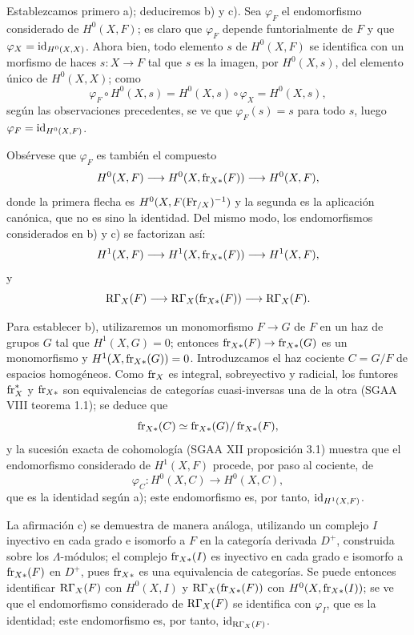 Establezcamos primero a); deduciremos b) y c). Sea $\varphi_F$ el endomorfismo considerado de $H^0(X,F)$; es claro que $\varphi_F$ depende funtorialmente de $F$ y que $\varphi_X=\operatorname{id}_{H^0(X,X)}$. Ahora bien, todo elemento $s$ de $H^0(X,F)$ se identifica con un morfismo de haces $s:X\to F$ tal que $s$ es la imagen, por $H^0(X,s)$, del elemento único de $H^0(X,X)$; como
\[
\varphi_F\circ H^0(X,s)=H^0(X,s)\circ\varphi_X=H^0(X,s),
\]
según las observaciones precedentes, se ve que $\varphi_F(s)=s$ para todo $s$, luego $\varphi_F=\operatorname{id}_{H^0(X,F)}$.

Obsérvese que $\varphi_F$ es también el compuesto
\[
H^0(X,F)\longrightarrow H^0(X,\operatorname{fr}_{X*}(F))
\longrightarrow H^0(X,F),
\]
donde la primera flecha es $H^0(X,F(\operatorname{Fr}_{/X})^{-1})$ y la segunda es la aplicación canónica, que no es sino la identidad. Del mismo modo, los endomorfismos considerados en b) y c) se factorizan así:
\[
H^1(X,F)\longrightarrow H^1(X,\operatorname{fr}_{X*}(F))
\longrightarrow H^1(X,F),
\]
y
\[
\mathrm{R}\Gamma_X(F)\longrightarrow \mathrm{R}\Gamma_X(\operatorname{fr}_{X*}(F))
\longrightarrow \mathrm{R}\Gamma_X(F).
\]

Para establecer b), utilizaremos un monomorfismo $F\to G$ de $F$ en un haz de grupos $G$ tal que $H^1(X,G)=0$; entonces $\operatorname{fr}_{X*}(F)\to\operatorname{fr}_{X*}(G)$ es un monomorfismo y $H^1(X,\operatorname{fr}_{X*}(G))=0$. Introduzcamos el haz cociente $C=G/F$ de espacios homogéneos. Como $\operatorname{fr}_X$ es integral, sobreyectivo y radicial, los funtores $\operatorname{fr}_X^*$ y $\operatorname{fr}_{X*}$ son equivalencias de categorías cuasi-inversas una de la otra (SGAA VIII teorema 1.1); se deduce que
\[
\operatorname{fr}_{X*}(C)\simeq\operatorname{fr}_{X*}(G)/\operatorname{fr}_{X*}(F),
\]
y la sucesión exacta de cohomología (SGAA XII proposición 3.1) muestra que el endomorfismo considerado de $H^1(X,F)$ procede, por paso al cociente, de
\[
\varphi_C:H^0(X,C)\longrightarrow H^0(X,C),
\]
que es la identidad según a); este endomorfismo es, por tanto, $\operatorname{id}_{H^1(X,F)}$.

La afirmación c) se demuestra de manera análoga, utilizando un complejo $I$ inyectivo en cada grado e isomorfo a $F$ en la categoría derivada $D^+$, construida sobre los $\Lambda$-módulos; el complejo $\operatorname{fr}_{X*}(I)$ es inyectivo en cada grado e isomorfo a $\operatorname{fr}_{X*}(F)$ en $D^+$, pues $\operatorname{fr}_{X*}$ es una equivalencia de categorías. Se puede entonces identificar $\mathrm{R}\Gamma_X(F)$ con $H^0(X,I)$ y $\mathrm{R}\Gamma_X(\operatorname{fr}_{X*}(F))$ con $H^0(X,\operatorname{fr}_{X*}(I))$; se ve que el endomorfismo considerado de $\mathrm{R}\Gamma_X(F)$ se identifica con $\varphi_I$, que es la identidad; este endomorfismo es, por tanto, $\operatorname{id}_{\mathrm{R}\Gamma_X(F)}$.
